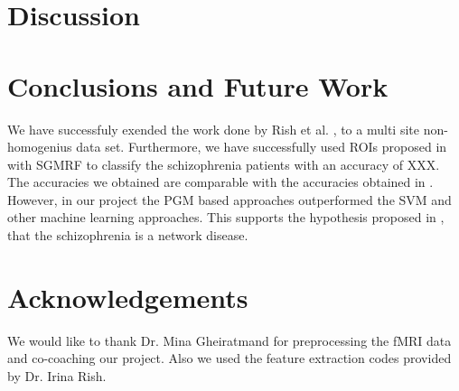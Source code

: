 \documentclass{article} %
\begin{document}
\section{Discussion}

\section{Conclusions and Future Work}
We have successfuly exended the work done by Rish et al. \cite{Rish_2013}, to a multi site non-homogenius data set. Furthermore, we have successfully used ROIs proposed in \cite{Power_2011} with SGMRF to classify the schizophrenia patients with an accuracy of XXX. The accuracies we obtained are comparable with the accuracies obtained in \cite{Cheng2015}. However, in our project the PGM based approaches outperformed the SVM and other machine learning approaches. This supports the hypothesis proposed in \cite{Rish_2013}, that the schizophrenia is a network disease.

   
\section{Acknowledgements}
We would like to thank Dr. Mina Gheiratmand for preprocessing the fMRI data 
and co-coaching our project. Also we used the feature extraction codes 
provided by Dr. Irina Rish.




	
\end{document}
